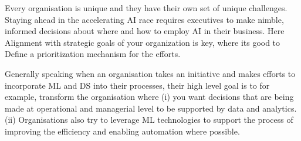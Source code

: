 \documentclass[openany]{book}
\begin{document}

Every organisation is unique and they have their own set of unique challenges.  Staying ahead in the accelerating AI race requires executives to make nimble, informed decisions about where and how to employ AI in their business. Here Alignment with strategic goals of your organization is key, where its good to Define a prioritization mechanism for the efforts. 

Generally speaking when an organisation takes an initiative and makes efforts to incorporate ML and DS into their processes, their high level goal is to for example, transform the organisation where (i) you want decisions that are being made at operational and managerial level to be supported by data and analytics. (ii) Organisations also try to leverage ML technologies to support the process of improving the efficiency and enabling automation where possible. 
\end{document}

